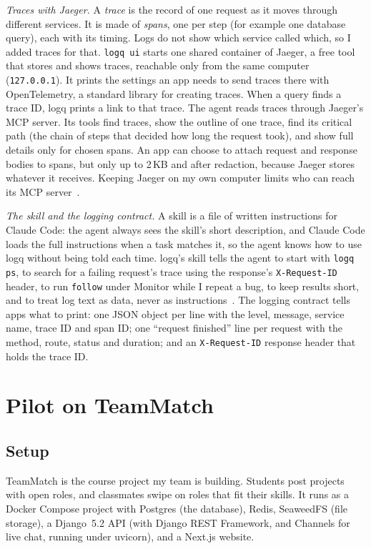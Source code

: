 \documentclass[10pt,conference]{IEEEtran}
\newcommand{\cmd}[1]{\texttt{#1}}
\begin{document}
\emph{Traces with Jaeger.} A \emph{trace} is the record of one request as it moves through different services. It is made of \emph{spans}, one per step (for example one database query), each with its timing. Logs do not show which service called which, so I added traces for that. \cmd{logq ui} starts one shared container of Jaeger, a free tool that stores and shows traces, reachable only from the same computer (\cmd{127.0.0.1}). It prints the settings an app needs to send traces there with OpenTelemetry, a standard library for creating traces. When a query finds a trace ID, logq prints a link to that trace. The agent reads traces through Jaeger's MCP server. Its tools find traces, show the outline of one trace, find its critical path (the chain of steps that decided how long the request took), and show full details only for chosen spans. An app can choose to attach request and response bodies to spans, but only up to 2\,KB and after redaction, because Jaeger stores whatever it receives. Keeping Jaeger on my own computer limits who can reach its MCP server~\cite{hou2026mcp}.

\emph{The skill and the logging contract.} A skill is a file of written instructions for Claude Code: the agent always sees the skill's short description, and Claude Code loads the full instructions when a task matches it, so the agent knows how to use logq without being told each time. logq's skill tells the agent to start with \cmd{logq ps}, to search for a failing request's trace using the response's \cmd{X-Request-ID} header, to run \cmd{follow} under Monitor while I repeat a bug, to keep results short, and to treat log text as data, never as instructions~\cite{greshake2023injection}. The logging contract tells apps what to print: one JSON object per line with the level, message, service name, trace ID and span ID; one ``request finished'' line per request with the method, route, status and duration; and an \cmd{X-Request-ID} response header that holds the trace ID.

\section{Pilot on TeamMatch}\label{sec:eval}

\subsection{Setup}

TeamMatch is the course project my team is building. Students post projects with open roles, and classmates swipe on roles that fit their skills. It runs as a Docker Compose project with Postgres (the database), Redis, SeaweedFS (file storage), a Django~5.2 API (with Django REST Framework, and Channels for live chat, running under uvicorn), and a Next.js website.
\end{document}
